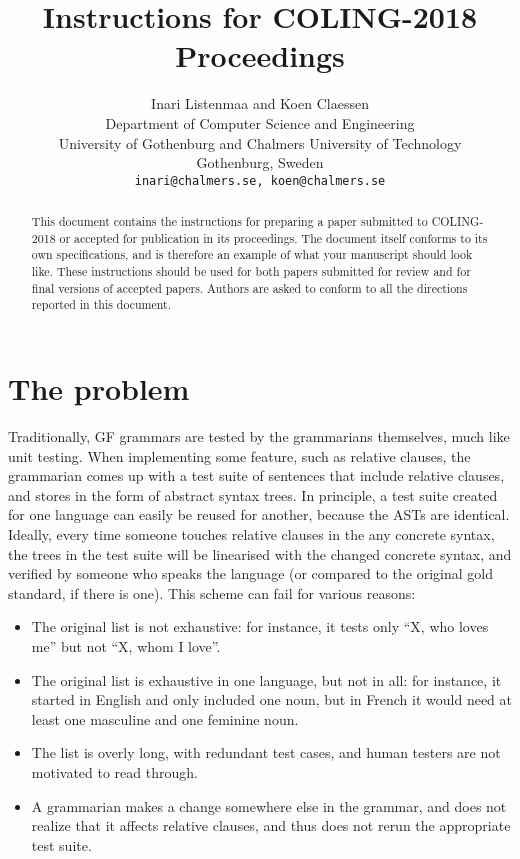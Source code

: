 \documentclass[11pt]{article}
\title{Instructions for COLING-2018 Proceedings}
\author{Inari Listenmaa and Koen Claessen \\
  Department of Computer Science and Engineering \\
  University of Gothenburg and Chalmers University of Technology \\
  Gothenburg, Sweden \\
  {\tt inari@chalmers.se, koen@chalmers.se} }
\date{}
\begin{document}
\maketitle
\begin{abstract}
  This document contains the instructions for preparing a paper submitted
  to COLING-2018 or accepted for publication in its proceedings. The document itself
  conforms to its own specifications, and is therefore an example of
  what your manuscript should look like. These instructions should be
  used for both papers submitted for review and for final versions of
  accepted papers. Authors are asked to conform to all the directions
  reported in this document.
\end{abstract}






\section{The problem}

Traditionally, GF grammars are tested by the grammarians themselves,
much like unit testing. When implementing some feature, such as 
relative clauses, the grammarian comes up with a test suite of 
sentences that include relative clauses, and stores in the form of 
abstract syntax trees. In principle, a test suite created for one 
language can easily be reused for another, because the ASTs are 
identical. Ideally, every time someone touches relative clauses 
in the any concrete syntax, the trees in the test suite will be 
linearised with the changed concrete syntax, and verified by someone
who speaks the language (or compared to the original gold standard, 
if there is one). This scheme can fail for various reasons: 

\begin{itemize}
\item The original list is not exhaustive: for instance, it tests only
``X, who loves me'' but not ``X, whom I love''. 
\item The original list is exhaustive in one language, but not in all:
for instance, it started in English and only included one noun, but in
French it would need at least one masculine and one feminine noun. 
\item The list is overly long, with redundant test cases, and human
testers are not motivated to read through. 
\item A grammarian makes a change somewhere else in the grammar, and
does not realize that it affects relative clauses, and thus does not
rerun the appropriate test suite. 
\end{itemize}
\end{document}
